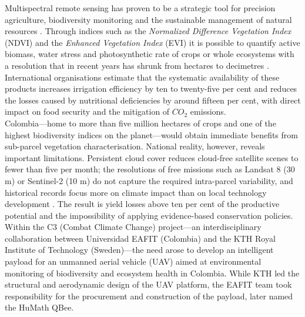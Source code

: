 \noindent Multispectral remote sensing has proven to be a strategic tool
for precision agriculture, biodiversity monitoring and the sustainable
management of natural resources \cite{Chuvieco2010}.  Through indices
such as the \emph{Normalized Difference Vegetation Index} (NDVI) and the
\emph{Enhanced Vegetation Index} (EVI) it is possible to quantify active
biomass, water stress and photosynthetic rate of crops or whole
ecosystems with a resolution that in recent years has shrunk from
hectares to decimetres \cite{Xue2017Significant}.  International
organisations estimate that the systematic availability of these
products increases irrigation efficiency by ten to twenty-five per cent
and reduces the losses caused by nutritional deficiencies by around
fifteen per cent, with direct impact on food security and the mitigation
of \(CO_2\) emissions.\\

\noindent Colombia—home to more than five million hectares of crops and one of
the highest biodiversity indices on the planet—would obtain immediate
benefits from sub-parcel vegetation characterisation.  National reality,
however, reveals important limitations.  Persistent cloud cover reduces
cloud-free satellite scenes to fewer than five per month; the
resolutions of free missions such as Landsat 8 (30 m) or Sentinel-2
(10 m) do not capture the required intra-parcel variability, and
historical records focus more on climate impact than on local technology
development \cite{Poveda2001SeasonalityColombia}.  The result is yield
losses above ten per cent of the productive potential and the
impossibility of applying evidence-based conservation policies.\\

\noindent Within the C3 (Combat Climate Change) project—an interdisciplinary collaboration between Universidad EAFIT (Colombia) and the KTH Royal Institute of Technology (Sweden)—the need arose to develop an intelligent payload for an unmanned aerial vehicle (UAV) aimed at environmental monitoring of biodiversity and ecosystem health in Colombia. While KTH led the structural and aerodynamic design of the UAV platform, the EAFIT team took responsibility for the procurement and construction of the payload, later named the HuMath\textregistered{} QBee.\\

